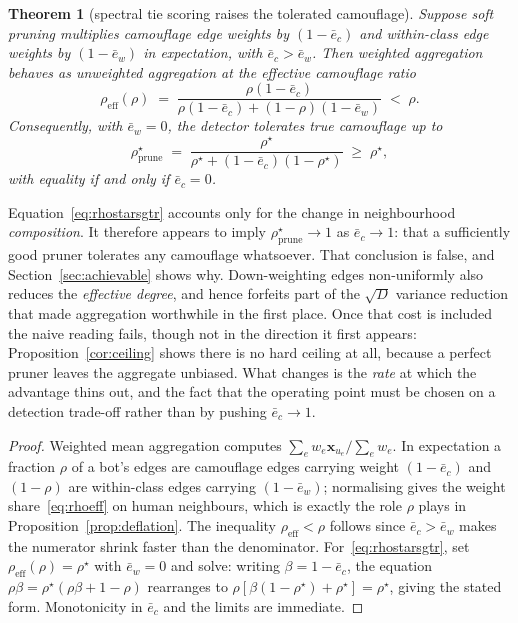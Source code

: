 \documentclass[onecolumn,pdflatex,sn-basic,Numbered]{sn-jnl}
\theoremstyle{thmstyleone}
\newtheorem{theorem}{Theorem}
\theoremstyle{thmstylethree}
\begin{document}
\begin{theorem}[spectral tie scoring raises the tolerated camouflage]
\label{thm:sgtr}
Suppose soft pruning multiplies camouflage edge weights by $(1-\bar e_c)$ and
within-class edge weights by $(1-\bar e_w)$ in expectation, with
$\bar e_c > \bar e_w$. Then weighted aggregation behaves as unweighted aggregation
at the \emph{effective} camouflage ratio
\begin{equation}
    \rho_{\mathrm{eff}}(\rho)
    \;=\; \frac{\rho(1-\bar e_c)}{\rho(1-\bar e_c) + (1-\rho)(1-\bar e_w)}
    \;<\; \rho .
    \label{eq:rhoeff}
\end{equation}
Consequently, with $\bar e_w = 0$, the detector tolerates true camouflage up to
\begin{equation}
    \rho^\star_{\mathrm{prune}}
    \;=\; \frac{\rho^\star}{\rho^\star + (1-\bar e_c)(1-\rho^\star)}
    \;\geq\; \rho^\star,
    \label{eq:rhostarsgtr}
\end{equation}
with equality if and only if $\bar e_c = 0$.
\end{theorem}

\noindent
Equation~\eqref{eq:rhostarsgtr} accounts only for the change in neighbourhood
\emph{composition}. It therefore appears to imply
$\rho^\star_{\mathrm{prune}} \to 1$ as $\bar e_c \to 1$: that a sufficiently good
pruner tolerates any camouflage whatsoever. That conclusion is false, and
Section~\ref{sec:achievable} shows why. Down-weighting edges non-uniformly also
reduces the \emph{effective degree}, and hence forfeits part of the $\sqrt{D}$
variance reduction that made aggregation worthwhile in the first place. Once that
cost is included the naive reading fails, though not in the direction it first
appears: Proposition~\ref{cor:ceiling} shows there is no hard ceiling at all, because
a perfect pruner leaves the aggregate unbiased. What changes is the \emph{rate} at
which the advantage thins out, and the fact that the operating point must be chosen on
a detection trade-off rather than by pushing $\bar e_c \to 1$.

\begin{proof}
Weighted mean aggregation computes $\sum_e w_e \mathbf{x}_{u_e} / \sum_e w_e$. In
expectation a fraction $\rho$ of a bot's edges are camouflage edges carrying weight
$(1-\bar e_c)$ and $(1-\rho)$ are within-class edges carrying $(1-\bar e_w)$;
normalising gives the weight share~\eqref{eq:rhoeff} on human neighbours, which is
exactly the role $\rho$ plays in Proposition~\ref{prop:deflation}. The inequality
$\rho_{\mathrm{eff}} < \rho$ follows since $\bar e_c > \bar e_w$ makes the numerator
shrink faster than the denominator. For~\eqref{eq:rhostarsgtr}, set
$\rho_{\mathrm{eff}}(\rho) = \rho^\star$ with $\bar e_w = 0$ and solve: writing
$\beta = 1-\bar e_c$, the equation $\rho\beta = \rho^\star(\rho\beta + 1 - \rho)$
rearranges to $\rho[\beta(1-\rho^\star) + \rho^\star] = \rho^\star$, giving the
stated form. Monotonicity in $\bar e_c$ and the limits are immediate.
\end{proof}
\end{document}
